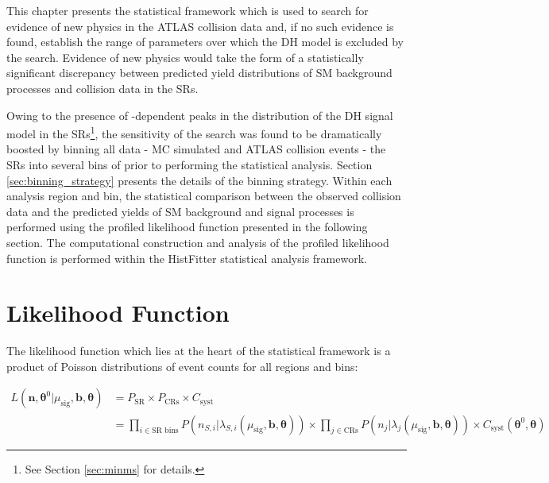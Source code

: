 \label{chapter:stat}

This chapter presents the statistical framework which is used to search for evidence of new physics in the ATLAS collision data and, if no such evidence is found, establish the range of parameters over which the DH model is excluded by the search. Evidence of new physics would take the form of a statistically significant discrepancy between predicted yield distributions of SM background processes and collision data in the SRs. 

Owing to the presence of \ms-dependent peaks in the \minms distribution of the DH signal model in the SRs\footnote{See Section \ref{sec:minms} for details.}, the sensitivity of the search was found to be dramatically boosted by binning all data - MC simulated and ATLAS collision events - the SRs into several bins of \minms prior to performing the statistical analysis. Section \ref{sec:binning_strategy} presents the details of the binning strategy. Within each analysis region and bin, the statistical comparison between the observed collision data and the predicted yields of SM background and signal processes is performed using the  profiled likelihood function presented in the following section. The computational construction and analysis of the profiled likelihood function is performed within the HistFitter \cite{Baak_2015} statistical analysis framework.

\section{Likelihood Function}
\label{sec:likelihood}

The likelihood function which lies at the heart of the statistical framework is a product of Poisson distributions of event counts for all regions and bins:

\begin{equation}
\label{eq:likelihood_func}
\begin{aligned}
L(\boldsymbol{n}, \boldsymbol{\theta}^0|\mu_\text{sig}, \boldsymbol{b}, \boldsymbol{\theta}) & = P_\text{SR} \times P_\text{CRs} \times C_\text{syst} \\
& = \prod_{i\in\text{SR bins}} P(n_{S,i}|\lambda_{S,i}(\mu_\text{sig}, \boldsymbol{b}, \boldsymbol{\theta})) \times \prod_{j \in \text{CRs}} P(n_j|\lambda_j(\mu_\text{sig}, \boldsymbol{b}, \boldsymbol{\theta})) \times C_\text{syst}(\boldsymbol{\theta}^0, \boldsymbol{\theta})
\end{aligned}
\end{equation}


